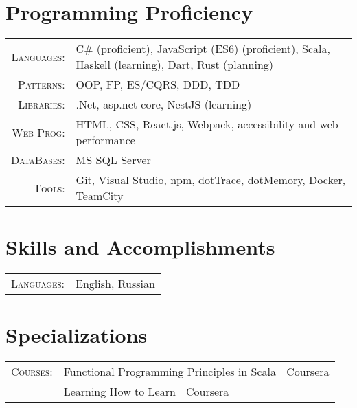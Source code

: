 \documentclass[a4paper,11pt]{article}
\begin{document}
\section{Programming Proficiency}
\begin{tabular}{rl}
  \textsc{Languages:}& C\# (proficient), JavaScript (ES6) (proficient), Scala, Haskell (learning), Dart, Rust (planning) \\
  \textsc{Patterns:}& OOP, FP, ES/CQRS, DDD, TDD\\
  \textsc{Libraries:}& .Net, asp.net core, NestJS (learning)\\
  \textsc{Web Prog:}& HTML, CSS, React.js, Webpack, accessibility and web performance\\
  \textsc{DataBases:}& MS SQL Server\\
  \textsc{Tools:}& Git, Visual Studio, npm, dotTrace, dotMemory, Docker, TeamCity\\
\end{tabular}

\section{Skills and Accomplishments}
\begin{tabular}{rl}
  \textsc{Languages:}& English, Russian\\
\end{tabular}

\section{Specializations}
\begin{tabular}{rl}
  \textsc{Courses:}
  &Functional Programming Principles in Scala | Coursera\\
  &Learning How to Learn | Coursera\\
\end{tabular}
\end{document}
